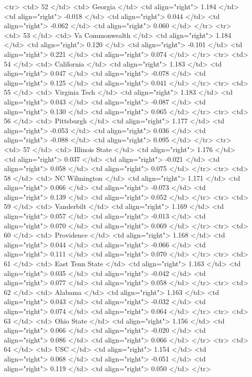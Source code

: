   <tr> <td> 52 </td> <td> Georgia </td> <td align="right"> 1.184 </td> <td align="right"> -0.018 </td> <td align="right"> 0.044 </td> <td align="right"> -0.062 </td> <td align="right"> 0.060 </td> </tr>
  <tr> <td> 53 </td> <td> Va Commonwealth </td> <td align="right"> 1.184 </td> <td align="right"> 0.120 </td> <td align="right"> -0.101 </td> <td align="right"> 0.221 </td> <td align="right"> 0.074 </td> </tr>
  <tr> <td> 54 </td> <td> California </td> <td align="right"> 1.183 </td> <td align="right"> 0.047 </td> <td align="right"> -0.078 </td> <td align="right"> 0.125 </td> <td align="right"> 0.041 </td> </tr>
  <tr> <td> 55 </td> <td> Virginia Tech </td> <td align="right"> 1.183 </td> <td align="right"> 0.043 </td> <td align="right"> -0.087 </td> <td align="right"> 0.130 </td> <td align="right"> 0.065 </td> </tr>
  <tr> <td> 56 </td> <td> Pittsburgh </td> <td align="right"> 1.177 </td> <td align="right"> -0.053 </td> <td align="right"> 0.036 </td> <td align="right"> -0.088 </td> <td align="right"> 0.095 </td> </tr>
  <tr> <td> 57 </td> <td> Illinois State </td> <td align="right"> 1.176 </td> <td align="right"> 0.037 </td> <td align="right"> -0.021 </td> <td align="right"> 0.058 </td> <td align="right"> 0.075 </td> </tr>
  <tr> <td> 58 </td> <td> NC Wilmington </td> <td align="right"> 1.171 </td> <td align="right"> 0.066 </td> <td align="right"> -0.073 </td> <td align="right"> 0.139 </td> <td align="right"> 0.052 </td> </tr>
  <tr> <td> 59 </td> <td> Vanderbilt </td> <td align="right"> 1.169 </td> <td align="right"> 0.057 </td> <td align="right"> -0.013 </td> <td align="right"> 0.070 </td> <td align="right"> 0.069 </td> </tr>
  <tr> <td> 60 </td> <td> Providence </td> <td align="right"> 1.168 </td> <td align="right"> 0.044 </td> <td align="right"> -0.066 </td> <td align="right"> 0.111 </td> <td align="right"> 0.070 </td> </tr>
  <tr> <td> 61 </td> <td> East Tenn State </td> <td align="right"> 1.163 </td> <td align="right"> 0.035 </td> <td align="right"> -0.042 </td> <td align="right"> 0.077 </td> <td align="right"> 0.058 </td> </tr>
  <tr> <td> 62 </td> <td> Alabama </td> <td align="right"> 1.163 </td> <td align="right"> 0.043 </td> <td align="right"> -0.032 </td> <td align="right"> 0.074 </td> <td align="right"> 0.064 </td> </tr>
  <tr> <td> 63 </td> <td> Ohio State </td> <td align="right"> 1.156 </td> <td align="right"> 0.066 </td> <td align="right"> -0.020 </td> <td align="right"> 0.086 </td> <td align="right"> 0.066 </td> </tr>
  <tr> <td> 64 </td> <td> USC </td> <td align="right"> 1.154 </td> <td align="right"> 0.068 </td> <td align="right"> -0.051 </td> <td align="right"> 0.119 </td> <td align="right"> 0.050 </td> </tr>
